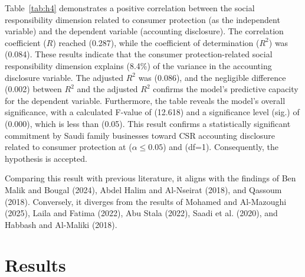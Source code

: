 \documentclass[10pt]{NSP1}
\begin{document}
Table~\ref{tab:h4} demonstrates a positive correlation between the social responsibility dimension related to consumer protection (as the independent variable) and the dependent variable (accounting disclosure). The correlation coefficient ($R$) reached (0.287), while the coefficient of determination ($R^2$) was (0.084). These results indicate that the consumer protection-related social responsibility dimension explains (8.4\%) of the variance in the accounting disclosure variable. The adjusted $R^2$ was (0.086), and the negligible difference (0.002) between $R^2$ and the adjusted $R^2$ confirms the model's predictive capacity for the dependent variable. Furthermore, the table reveals the model's overall significance, with a calculated F-value of (12.618) and a significance level (sig.) of (0.000), which is less than (0.05). This result confirms a statistically significant commitment by Saudi family businesses toward CSR accounting disclosure related to consumer protection at ($\alpha \leq 0.05$) and (df=1). Consequently, the hypothesis is accepted.

Comparing this result with previous literature, it aligns with the findings of Ben Malik and Bougal (2024), Abdel Halim and Al-Nseirat (2018), and Qassoum (2018). Conversely, it diverges from the results of Mohamed and Al-Mazoughi (2025), Laila and Fatima (2022), Abu Stala (2022), Saadi et al. (2020), and Habbash and Al-Maliki (2018).

\section{Results}
\end{document}

